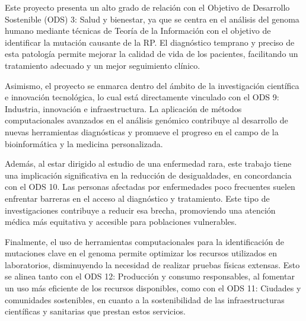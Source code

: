 \documentclass[11pt,spanish,listoffigures,listoftables]{tfgetsinf}
\begin{document}
Este proyecto presenta un alto grado de relación con el Objetivo de Desarrollo Sostenible (\ac{ODS}) 3: Salud y bienestar, ya que se centra en el análisis del genoma humano mediante técnicas de Teoría de la Información con el objetivo de identificar la mutación causante de la \ac{RP}. El diagnóstico temprano y preciso de esta patología permite mejorar la calidad de vida de los pacientes, facilitando un tratamiento adecuado y un mejor seguimiento clínico.

Asimismo, el proyecto se enmarca dentro del ámbito de la investigación científica e innovación tecnológica, lo cual está directamente vinculado con el \ac{ODS} 9: Industria, innovación e infraestructura. La aplicación de métodos computacionales avanzados en el análisis genómico contribuye al desarrollo de nuevas herramientas diagnósticas y promueve el progreso en el campo de la bioinformática y la medicina personalizada.

Además, al estar dirigido al estudio de una enfermedad rara, este trabajo tiene una implicación significativa en la reducción de desigualdades, en concordancia con el \ac{ODS} 10. Las personas afectadas por enfermedades poco frecuentes suelen enfrentar barreras en el acceso al diagnóstico y tratamiento. Este tipo de investigaciones contribuye a reducir esa brecha, promoviendo una atención médica más equitativa y accesible para poblaciones vulnerables.

Finalmente, el uso de herramientas computacionales para la identificación de mutaciones clave en el genoma permite optimizar los recursos utilizados en laboratorios, disminuyendo la necesidad de realizar pruebas físicas extensas. Esto se alinea tanto con el \ac{ODS} 12: Producción y consumo responsables, al fomentar un uso más eficiente de los recursos disponibles, como con el \ac{ODS} 11: Ciudades y comunidades sostenibles, en cuanto a la sostenibilidad de las infraestructuras científicas y sanitarias que prestan estos servicios.







\end{document}
